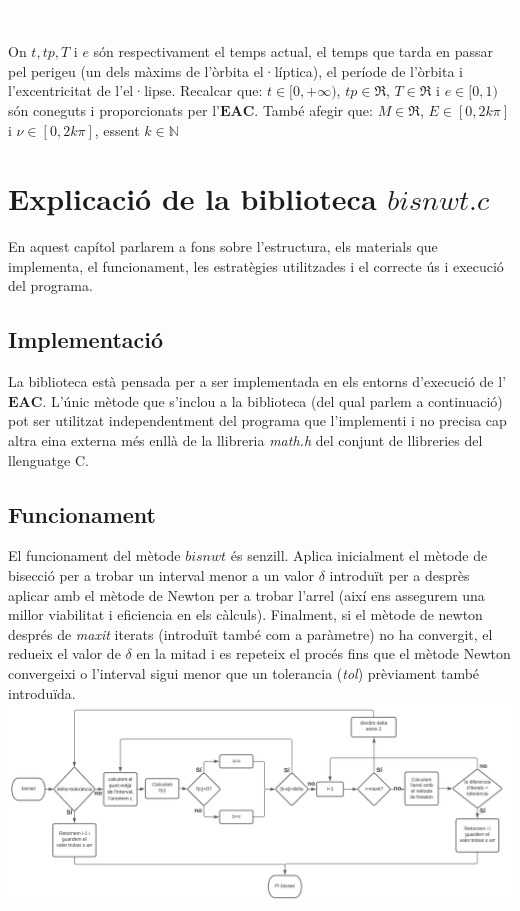 \documentclass[12pt]{article}
\begin{document}
\textcolor{white}{hola}
\\
\\
On $t, tp, T$ i $e$ són respectivament el temps actual, el temps que tarda en passar pel perigeu (un dels màxims de l'òrbita el·líptica), el període de l'òrbita i l'excentricitat de l'el·lipse.
\newline
Recalcar que: $t\in[0,+\infty)$, $tp\in\Re$, $T\in\Re$ i $e\in[0,1)$ són coneguts i proporcionats per l'$\mathbf{EAC}$.
També afegir que: $M\in\Re$, $E\in[0,2k\pi]$ i $\nu\in[0,2k\pi]$, essent $k\in\mathbb{N}$
\newpage
\section{Explicació de la biblioteca $bisnwt.c$}
En aquest capítol parlarem a fons sobre l'estructura, els materials que implementa, el funcionament, les estratègies utilitzades i el correcte ús i execució del programa.
\subsection{Implementació}
La biblioteca està pensada per a ser implementada en els entorns d'execució de l'$\mathbf{EAC}$.
\newline
L'únic mètode que s'inclou a la biblioteca (del qual parlem a continuació) pot ser utilitzat independentment del programa que l'implementi i no precisa cap altra eina externa més enllà de la llibreria \textit{math.h} del conjunt de llibreries del llenguatge C.
\subsection{Funcionament}
El funcionament del mètode $bisnwt$ és senzill. Aplica inicialment el mètode de bisecció per a trobar un interval menor a un valor $\delta$ introduït per a desprès aplicar amb el mètode de Newton per a trobar l'arrel (així ens assegurem una millor viabilitat i eficiencia en els càlculs). \newline
Finalment, si el mètode de newton després de \textit{maxit} iterats (introduït també com a paràmetre) no ha convergit, el redueix el valor de $\delta$ en la mitad i es repeteix el procés fins que el mètode Newton convergeixi o l'interval sigui menor que un tolerancia (\textit{tol}) prèviament també introduïda.\newline\newline
\includegraphics[width=1\textwidth]{diagrama-bisnwt.PNG}
\newpage
\end{document}
